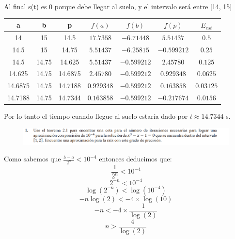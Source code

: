 \documentclass[12pt]{article}
\begin{document}
Al final s(t) es 0 porque debe llegar al suelo, y el intervalo será entre [14, 15]
\begin{center}
    \begin{tabular}{|c|c|c|c|c|c|c|}
        \hline
        a & b&p&$f(a)$&$f(b)$&$f(p)$&$E_{est}$\\
        \hline
        14   & 15    &  14.5    & $17.7358$ & $-6.71448$ & $5.51437$& $0.5$\\
        14.5 & 15    &  14.75   & $5.51437$ & $-6.25815$ & $-0.599212$& $0.25$\\
        14.5 & 14.75 &  14.625  & $5.51437$ & $-0.599212$& $2.45780$& $0.125$\\
       14.625& 14.75 &  14.6875 & $2.45780$& $-0.599212$& $0.929348$& $0.0625$\\
     14.6875 & 14.75 & 14.7188 & $0.929348$& $-0.599212$& $0.163858$& $0.03125$\\
     14.7188 & 14.75 & 14.7344 & $0.163858$& $-0.599212$& $-0.217674$& $0.0156$\\
        \hline
      \end{tabular} 
\end{center}
Por lo tanto el tiempo cuando llegue al suelo estaría dado por $t \approx 14.7344$ s.

\begin{figure}[H]
    \centering
    \includegraphics[width=1\textwidth]{./inFiles/Figures/Cap3.png}
\end{figure}

Como sabemos que $\frac{b-a}{2^n} < 10^{-4}$ entonces deducimos que:
$$\frac{1}{2^n} < 10^{-4}$$
$$2^{-n} < 10^{-4}$$
$$\log(2^{-n}) < \log(10^{-4})$$
$$-n\log(2) < -4\times\log(10)$$
$$-n < -4\times\frac{1}{\log(2)}$$
$$ n > \frac{4}{\log(2)}$$
\end{document}
